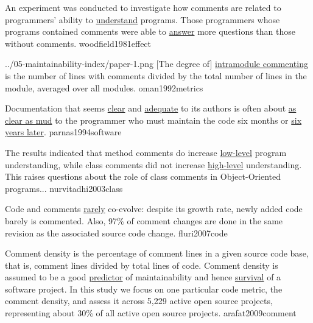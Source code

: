 \documentclass{article}
\begin{document}

  {An experiment was conducted to investigate how comments are related to programmers' ability to \ul{understand} programs. Those programmers whose programs contained comments were able to \ul{answer} more questions than those without comments.}
  {woodfield1981effect}

\qte
  {../05-maintainability-index/paper-1.png}
  {[The degree of] \ul{intramodule commenting} is the number of lines with comments divided by the total number of lines in the module, averaged over all modules.}
  {oman1992metrics}

  {Documentation that seems \ul{clear} and \ul{adequate} to its authors is often about \ul{as clear as mud} to the programmer who must maintain the code six months or \ul{six years later}.}
  {parnas1994software}


  {The results indicated that method comments do increase \ul{low-level} program understanding, while class comments did not increase \ul{high-level} understanding. This raises questions about the role of class comments in Object-Oriented programs...}
  {nurvitadhi2003class}

  {Code and comments \ul{rarely} co-evolve: despite its growth rate, newly added code barely is commented. Also, 97\% of comment changes are done in the same revision as the associated source code change.}
  {fluri2007code}

  {Comment density is the percentage of comment lines in a given source code base, that is, comment lines divided by total lines of code. Comment density is assumed to be a good \ul{predictor} of maintainability and hence \ul{survival} of a software project. In this study we focus on one particular code metric, the comment density, and assess it across 5,229 active open source projects, representing about 30\% of all active open source projects.}
  {arafat2009comment}
\end{document}
